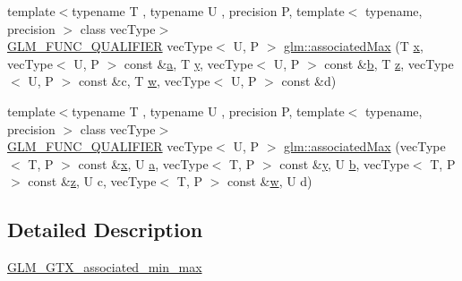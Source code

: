\begin{DoxyCompactItemize}
\item 
{\footnotesize template$<$typename T , typename U , precision P, template$<$ typename, precision $>$ class vec\+Type$>$ }\\\mbox{\hyperlink{setup_8hpp_a33fdea6f91c5f834105f7415e2a64407}{G\+L\+M\+\_\+\+F\+U\+N\+C\+\_\+\+Q\+U\+A\+L\+I\+F\+I\+ER}} vec\+Type$<$ U, P $>$ \mbox{\hyperlink{group__gtx__associated__min__max_ga7a165de1af9a3f9193516a3b47407086}{glm\+::associated\+Max}} (T \mbox{\hyperlink{glad_8h_a92d0386e5c19fb81ea88c9f99644ab1d}{x}}, vec\+Type$<$ U, P $>$ const \&\mbox{\hyperlink{glad_8h_ac8729153468b5dcf13f971b21d84d4e5}{a}}, T \mbox{\hyperlink{glad_8h_a66ddd433d2cacfe27f5906b7e86faeed}{y}}, vec\+Type$<$ U, P $>$ const \&\mbox{\hyperlink{glad_8h_a6eba317e3cf44d6d26c04a5a8f197dcb}{b}}, T \mbox{\hyperlink{glad_8h_acb78bf1972d3eaf07da34ff2e0a2f133}{z}}, vec\+Type$<$ U, P $>$ const \&c, T \mbox{\hyperlink{glad_8h_a1d0296e9e835f2e1ee17634af95fc1ec}{w}}, vec\+Type$<$ U, P $>$ const \&d)
\item 
{\footnotesize template$<$typename T , typename U , precision P, template$<$ typename, precision $>$ class vec\+Type$>$ }\\\mbox{\hyperlink{setup_8hpp_a33fdea6f91c5f834105f7415e2a64407}{G\+L\+M\+\_\+\+F\+U\+N\+C\+\_\+\+Q\+U\+A\+L\+I\+F\+I\+ER}} vec\+Type$<$ U, P $>$ \mbox{\hyperlink{group__gtx__associated__min__max_ga3122fbe8133ea54749b10fb93e8a167e}{glm\+::associated\+Max}} (vec\+Type$<$ T, P $>$ const \&\mbox{\hyperlink{glad_8h_a92d0386e5c19fb81ea88c9f99644ab1d}{x}}, U \mbox{\hyperlink{glad_8h_ac8729153468b5dcf13f971b21d84d4e5}{a}}, vec\+Type$<$ T, P $>$ const \&\mbox{\hyperlink{glad_8h_a66ddd433d2cacfe27f5906b7e86faeed}{y}}, U \mbox{\hyperlink{glad_8h_a6eba317e3cf44d6d26c04a5a8f197dcb}{b}}, vec\+Type$<$ T, P $>$ const \&\mbox{\hyperlink{glad_8h_acb78bf1972d3eaf07da34ff2e0a2f133}{z}}, U c, vec\+Type$<$ T, P $>$ const \&\mbox{\hyperlink{glad_8h_a1d0296e9e835f2e1ee17634af95fc1ec}{w}}, U d)
\end{DoxyCompactItemize}


\subsection{Detailed Description}
\mbox{\hyperlink{group__gtx__associated__min__max}{G\+L\+M\+\_\+\+G\+T\+X\+\_\+associated\+\_\+min\+\_\+max}} 